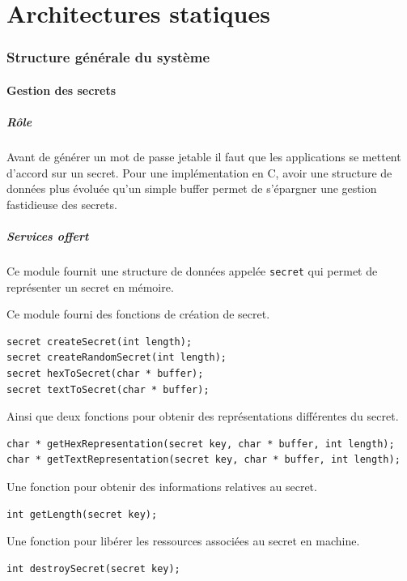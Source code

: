 \documentclass{"../../res/univ-projet"}
\begin{document}
\part*{Architectures statiques}
\section{Structure générale du système}

\subsection{Gestion des secrets}
\subsubsection{Rôle}
Avant de générer un mot de passe jetable il faut que les applications se mettent
d'accord sur un secret. Pour une implémentation en C, avoir une structure de données
plus évoluée qu'un simple buffer permet de s'épargner une gestion fastidieuse des secrets.

\subsubsection{Services offert}
Ce module fournit une structure de données appelée \verb?secret? qui permet de représenter
un secret en mémoire.

Ce module fourni des fonctions de création de secret.
\begin{lstlisting}
secret createSecret(int length);
secret createRandomSecret(int length);
secret hexToSecret(char * buffer);
secret textToSecret(char * buffer);
\end{lstlisting}
Ainsi que deux fonctions pour obtenir des représentations différentes du secret.
\begin{lstlisting}
char * getHexRepresentation(secret key, char * buffer, int length);
char * getTextRepresentation(secret key, char * buffer, int length);
\end{lstlisting}
Une fonction pour obtenir des informations relatives au secret.
\begin{lstlisting}
int getLength(secret key);
\end{lstlisting}
Une fonction pour libérer les ressources associées au secret en machine.
\begin{lstlisting}
int destroySecret(secret key);
\end{lstlisting}
\end{document}
